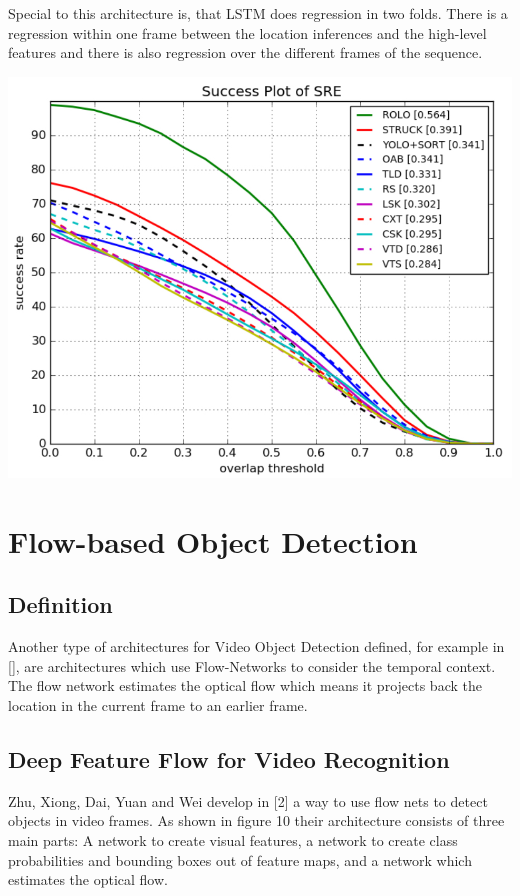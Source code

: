 \documentclass[conference]{IEEEtran}
\begin{document}
Special to this architecture is, that LSTM does regression in two folds. There is a regression within one frame between the location inferences and the high-level features and there is also regression over the different frames of the sequence. \newline

\includegraphics[width=\columnwidth]{otb-challenge-results} \newline

\section{Flow-based Object Detection}

\subsection{Definition}
Another type  of architectures for Video Object Detection defined, for example in [], are architectures which use Flow-Networks to consider the temporal context. The flow network estimates the optical flow which means it projects back the location in the current frame to an earlier frame. 

\subsection{Deep Feature Flow for Video Recognition}
Zhu, Xiong, Dai, Yuan and Wei develop in [2] a way to use flow nets to detect objects in video frames. As shown in figure 10 their architecture consists of three main parts: A network to create visual features, a network to create class probabilities and bounding boxes out of feature maps, and a network which estimates the optical flow. \newline
\end{document}
